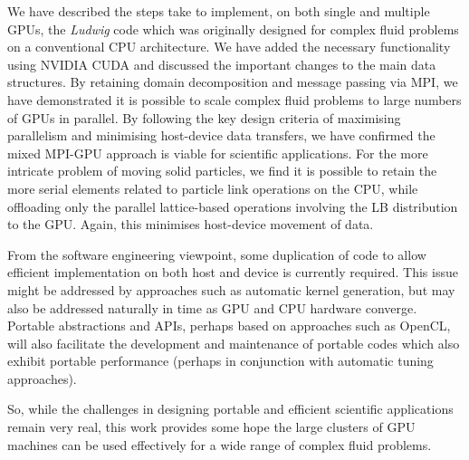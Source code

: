We have described the steps take to implement, on both single and
multiple GPUs, the \textit{Ludwig} code which was originally
designed for complex fluid problems on a conventional CPU
architecture. We have added the necessary functionality using
NVIDIA CUDA and discussed the important changes to the main
data structures. By retaining domain decomposition and message
passing via MPI, we have demonstrated it is possible to scale
complex fluid problems to large numbers of GPUs in parallel.
By following the key design criteria of maximising parallelism
and minimising host-device data transfers, we have confirmed
the mixed MPI-GPU approach is viable for scientific applications.
For the more intricate problem of moving solid particles, we find
it is possible to retain the more serial elements related to
particle link operations on the CPU, while offloading only the
parallel lattice-based operations involving the LB distribution
to the GPU. Again, this minimises host-device movement of data.

From the software engineering viewpoint, some duplication of code
to allow efficient implementation on both host and device is
currently required. This issue might be addressed by approaches
such as automatic kernel generation, but may also be addressed
naturally in time as GPU and CPU hardware converge. Portable
abstractions and APIs, perhaps based on approaches such as OpenCL,
will also facilitate the development and maintenance of portable
codes which also exhibit portable performance (perhaps in conjunction
with automatic tuning approaches).

So, while the challenges in designing portable and efficient scientific
applications remain very real, this work provides some hope the large
clusters of GPU machines can be used effectively for a wide range of
complex fluid problems.



